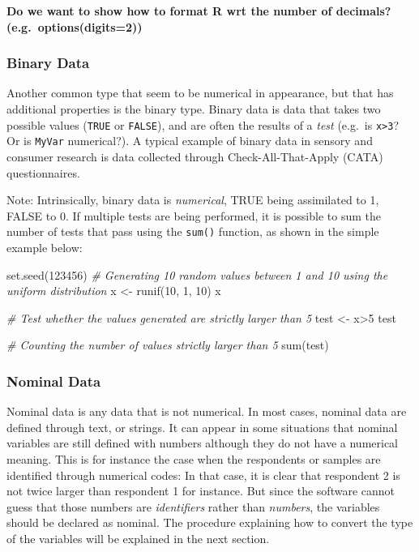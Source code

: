 \documentclass[
]{book}
\newenvironment{Shaded}{\begin{snugshade}}{\end{snugshade}}
\newcommand{\CommentTok}[1]{\textcolor[rgb]{0.56,0.35,0.01}{\textit{#1}}}
\newcommand{\DecValTok}[1]{\textcolor[rgb]{0.00,0.00,0.81}{#1}}
\newcommand{\FunctionTok}[1]{\textcolor[rgb]{0.00,0.00,0.00}{#1}}
\newcommand{\NormalTok}[1]{#1}
\newcommand{\OtherTok}[1]{\textcolor[rgb]{0.56,0.35,0.01}{#1}}
\newcommand{\SpecialCharTok}[1]{\textcolor[rgb]{0.00,0.00,0.00}{#1}}
\begin{document}
\textbf{Do we want to show how to format R wrt the number of decimals? (e.g.~options(digits=2))}

\hypertarget{binary-data}{%
\subsubsection{Binary Data}\label{binary-data}}

Another common type that seem to be numerical in appearance, but that has additional properties is the binary type.
Binary data is data that takes two possible values (\texttt{TRUE} or \texttt{FALSE}), and are often the results of a \emph{test} (e.g.~is \texttt{x\textgreater{}3}? Or is \texttt{MyVar} numerical?). A typical example of binary data in sensory and consumer research is data collected through Check-All-That-Apply (CATA) questionnaires.

Note: Intrinsically, binary data is \emph{numerical}, TRUE being assimilated to 1, FALSE to 0. If multiple tests are being performed, it is possible to sum the number of tests that pass using the \texttt{sum()} function, as shown in the simple example below:

\begin{Shaded}
\begin{Highlighting}[]
\FunctionTok{set.seed}\NormalTok{(}\DecValTok{123456}\NormalTok{)}
\CommentTok{\# Generating 10 random values between 1 and 10 using the uniform distribution}
\NormalTok{x }\OtherTok{\textless{}{-}} \FunctionTok{runif}\NormalTok{(}\DecValTok{10}\NormalTok{, }\DecValTok{1}\NormalTok{, }\DecValTok{10}\NormalTok{)}
\NormalTok{x}

\CommentTok{\# Test whether the values generated are strictly larger than 5}
\NormalTok{test }\OtherTok{\textless{}{-}}\NormalTok{ x}\SpecialCharTok{\textgreater{}}\DecValTok{5}
\NormalTok{test}

\CommentTok{\# Counting the number of values strictly larger than 5}
\FunctionTok{sum}\NormalTok{(test)}
\end{Highlighting}
\end{Shaded}

\hypertarget{nominal-data}{%
\subsubsection{Nominal Data}\label{nominal-data}}

Nominal data is any data that is not numerical. In most cases, nominal data are defined through text, or strings. It can appear in some situations that nominal variables are still defined with numbers although they do not have a numerical meaning. This is for instance the case when the respondents or samples are identified through numerical codes: In that case, it is clear that respondent 2 is not twice larger than respondent 1 for instance. But since the software cannot guess that those numbers are \emph{identifiers} rather than \emph{numbers}, the variables should be declared as nominal. The procedure explaining how to convert the type of the variables will be explained in the next section.
\end{document}
